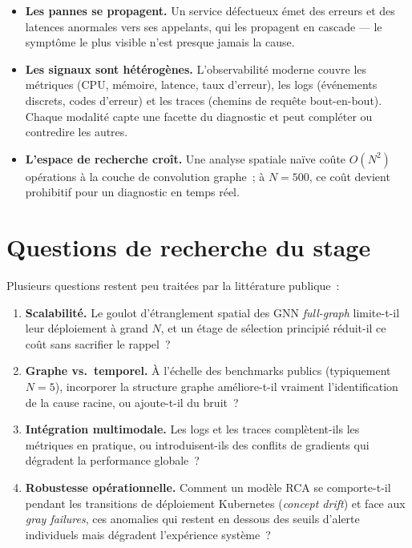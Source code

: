 \documentclass[a4paper,11pt,oneside]{report}
\begin{document}
\begin{itemize}
  \item \textbf{Les pannes se propagent.} Un service d\'efectueux \'emet des erreurs et des latences anormales vers ses appelants, qui les propagent en cascade --- le sympt\^ome le plus visible n'est presque jamais la cause.
  \item \textbf{Les signaux sont h\'et\'erog\`enes.} L'observabilit\'e moderne couvre les m\'etriques (CPU, m\'emoire, latence, taux d'erreur), les logs (\'ev\'enements discrets, codes d'erreur) et les traces (chemins de requ\^ete bout-en-bout). Chaque modalit\'e capte une facette du diagnostic et peut compl\'eter ou contredire les autres.
  \item \textbf{L'espace de recherche cro\^it.} Une analyse spatiale na\"ive co\^ute $O(N^2)$ op\'erations \`a la couche de convolution graphe~; \`a $N{=}500$, ce co\^ut devient prohibitif pour un diagnostic en temps r\'eel.
\end{itemize}

\section{Questions de recherche du stage}
\label{sec:questions}

Plusieurs questions restent peu trait\'ees par la litt\'erature publique~:

\begin{enumerate}
  \item \textbf{Scalabilit\'e.} Le goulot d'\'etranglement spatial des GNN \emph{full-graph} limite-t-il leur d\'eploiement \`a grand $N$, et un \'etage de s\'election principi\'e r\'eduit-il ce co\^ut sans sacrifier le rappel~?
  \item \textbf{Graphe vs.\ temporel.} \`A l'\'echelle des benchmarks publics (typiquement $N{=}5$), incorporer la structure graphe am\'eliore-t-il vraiment l'identification de la cause racine, ou ajoute-t-il du bruit~?
  \item \textbf{Int\'egration multimodale.} Les logs et les traces compl\`etent-ils les m\'etriques en pratique, ou introduisent-ils des conflits de gradients qui d\'egradent la performance globale~?
  \item \textbf{Robustesse op\'erationnelle.} Comment un mod\`ele RCA se comporte-t-il pendant les transitions de d\'eploiement Kubernetes (\emph{concept drift}) et face aux \emph{gray failures}, ces anomalies qui restent en dessous des seuils d'alerte individuels mais d\'egradent l'exp\'erience syst\`eme~?
\end{enumerate}
\end{document}
